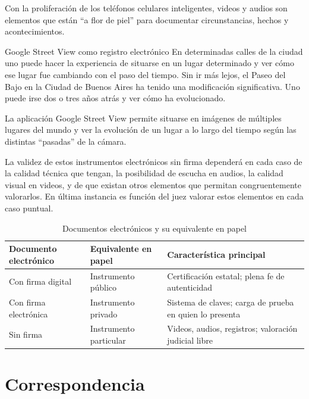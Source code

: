 \documentclass[12pt,oneside]{book}
\begin{document}
Con la proliferación de los teléfonos celulares inteligentes, videos y audios son elementos que están ``a flor de piel'' para documentar circunstancias, hechos y acontecimientos.

\begin{example}{Google Street View como registro electrónico}
En determinadas calles de la ciudad uno puede hacer la experiencia de situarse en un lugar determinado y ver cómo ese lugar fue cambiando con el paso del tiempo. Sin ir más lejos, el Paseo del Bajo en la Ciudad de Buenos Aires ha tenido una modificación significativa. Uno puede irse dos o tres años atrás y ver cómo ha evolucionado.
\end{example}

La aplicación Google Street View permite situarse en imágenes de múltiples lugares del mundo y ver la evolución de un lugar a lo largo del tiempo según las distintas ``pasadas'' de la cámara.

La validez de estos instrumentos electrónicos sin firma dependerá en cada caso de la calidad técnica que tengan, la posibilidad de escucha en audios, la calidad visual en videos, y de que existan otros elementos que permitan congruentemente valorarlos. En última instancia es función del juez valorar estos elementos en cada caso puntual.

\begin{table}[H]
\centering
\caption{Documentos electrónicos y su equivalente en papel}
\begin{tabularx}{\textwidth}{>{\raggedright\arraybackslash}p{} >{\raggedright\arraybackslash}p{} >{\raggedright\arraybackslash}X}
\toprule
\textbf{Documento electrónico} & \textbf{Equivalente en papel} & \textbf{Característica principal} \\
\midrule
Con firma digital & Instrumento público & Certificación estatal; plena fe de autenticidad \\
Con firma electrónica & Instrumento privado & Sistema de claves; carga de prueba en quien lo presenta \\
Sin firma & Instrumento particular & Videos, audios, registros; valoración judicial libre \\
\bottomrule
\end{tabularx}
\end{table}

\chapter{Correspondencia}
\end{document}
